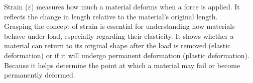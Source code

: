 \documentclass{article}
\begin{document}
        Strain ($\varepsilon$) measures how much a material deforms when a force is applied. It reflects the change in length relative to the material's original length.\\[8pt]
        Grasping the concept of strain is essential for understanding how materials behave under load, especially regarding their elasticity. It shows whether a material can return to its original shape after the load is removed (elastic deformation) or if it will undergo permanent deformation (plastic deformation). Because it helps determine the point at which a material may fail or become permanently deformed.
\end{document}
